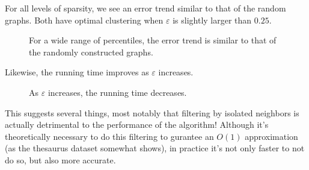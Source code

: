 \documentclass[
]{article}
\begin{document}
For all levels of sparsity, we see an error trend similar to that of the
random graphs. Both have optimal clustering when $\varepsilon$ is slightly larger
than $0.25$.
\begin{figure}[!htb]
  \caption{\label{fig:percentile-change}
    For a wide range of percentiles, the error trend is similar to that of the
    randomly constructed graphs.}
\end{figure}

Likewise, the running time improves as {\(\varepsilon\)} increases.\\
\begin{figure}[!htb]
  \caption{\label{fig:running-time-word-vector}
    As $\varepsilon$ increases, the running time decreases.}
\end{figure}

This suggests several things, most notably that filtering by isolated
neighbors is actually detrimental to the performance of the algorithm!
Although it's theoretically necessary to do this
filtering to gurantee an {\(O(1)\)} approximation (as the thesaurus
dataset somewhat shows), in practice it's not only
faster to not do so, but also more accurate.
\end{document}
